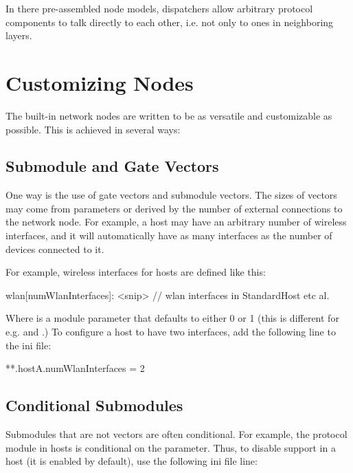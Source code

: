 In there pre-assembled node models, dispatchers allow arbitrary
protocol components to talk directly to each other, i.e. not only
to ones in neighboring layers.

\section{Customizing Nodes}
\label{sec:nodes:customizing-nodes}

The built-in network nodes are written to be as versatile and customizable
as possible. This is achieved in several ways:

\subsection*{Submodule and Gate Vectors}

One way is the use of gate vectors and submodule vectors. The sizes
of vectors may come from parameters or derived by the number of
external connections to the network node. For example, a host may
have an arbitrary number of wireless interfaces, and it will automatically
have as many  interfaces as the number of 
devices connected to it.

For example, wireless interfaces for hosts are defined like this:

\begin{ned}
wlan[numWlanInterfaces]: <snip> // wlan interfaces in StandardHost etc al.
\end{ned}

Where  is a module parameter that defaults to
either 0 or 1 (this is different for e.g.  and
.) To configure a host to have two interfaces,
add the following line to the ini file:

\begin{inifile}
**.hostA.numWlanInterfaces = 2
\end{inifile}

\subsection*{Conditional Submodules}

Submodules that are not vectors are often conditional. For example,
the  protocol module in hosts is conditional on
the  parameter. Thus, to disable  support
in a host (it is enabled by default), use the following ini file line:

